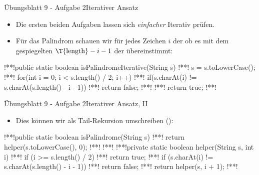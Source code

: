 \iffull
\begin{frame}[c,fragile]{Übungsblatt 9 - Aufgabe 2\hfill Iterativer Ansatz}
    \begin{itemize}[<+(1)->]
        \item Die ersten beiden Aufgaben lassen sich \textit{einfacher} Iterativ prüfen.
        \item Für das Palindrom schauen wir für jedes Zeichen \(i\) der  ob es mit dem gespiegelten \(\text{\T{length}} - i - 1\) der  übereinstimmt:
    \end{itemize}
\begin{plainjava}
!**!public static boolean isPalindromeIterative(String s) {
!**!    s = s.toLowerCase();
!**!    for(int i = 0; i < s.length() / 2; i++) {
!**!        if(s.charAt(i) != s.charAt(s.length() - i - 1))
!**!            return false;
!**!    }
!**!    return true;
!**!}
\end{plainjava}
\end{frame}

\begin{frame}[c,fragile]{Übungsblatt 9 - Aufgabe 2\hfill Iterativer Ansatz, II}
    \begin{itemize}[<+(1)->]
        \item Dies können wir als Tail-Rekursion umschreiben ():
    \end{itemize}
\begin{plainjava}
!**!public static boolean isPalindrome(String s) {
!**!    return helper(s.toLowerCase(), 0);
!**!}
!**!
!**!private static boolean helper(String s, int i) {
!**!    if (i >= s.length() / 2)
!**!        return true;
!**!    if (s.charAt(i) != s.charAt(s.length() - i - 1))
!**!        return false;
!**!    return helper(s, i + 1);
!**!}
\end{plainjava}
\end{frame}
\fi

